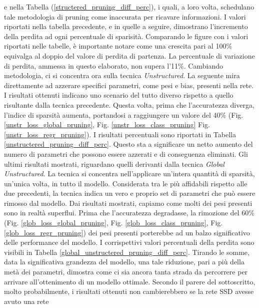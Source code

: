 e nella Tabella (\ref{structered_pruning_diff_perc}), i quali, a loro volta, schedulano tale metodologia 
di pruning come inaccurata per ricavare informazioni. I valori riportati 
nella tabella precedente, e in quelle a seguire, dimostrano l'incremento 
della perdita ad ogni percentuale di sparisità. Comparando le figure con i 
valori riportati nelle tabelle, è importante notare come una crescita pari al 
100\% equivalga al doppio del valore di perdita di partenza. La percentuale 
di variazione di perdita, ammessa in questo elaborato, non supera l'11\%.
Cambiando metodologia, ci si concentra ora sulla tecnica \emph{Unstructured}. La 
seguente mira direttamente ad azzerare specifici parametri, come pesi e bias, 
presenti nella rete. I risultati ottenuti indicano uno scenario del tutto diverso 
rispetto a quello risultante dalla tecnica precedente. Questa volta, prima che 
l'accuratezza diverga, l'indice di sparsità aumenta, portandosi a raggiungere 
un valore del 40\% (Fig. \ref{unstr_loss_global_pruning}, Fig. \ref{unstr_loss_class_pruning} Fig. \ref{unstr_loss_regr_pruning}). I risultati percentuali 
sono riportati in Tabella \ref{unstructered_pruning_diff_perc}. Questo sta a significare un netto aumento del 
numero di parametri che possono essere azzerati e di conseguenza eliminati. 
Gli ultimi risultati mostrati, riguardano quelli derivanti dalla tecnica \emph{Global 
Unstructured}. La tecnica si concentra nell'applicare un'intera quantità 
di sparsità, un'unica volta, in tutto il modello. Considerata tra le più 
affidabili rispetto alle due precedenti, la tecnica indica un vero e proprio 
set di parametri che può essere rimosso dal modello. Dai risultati mostrati, 
capiamo come molti dei pesi presenti sono in realtà superflui. Prima che 
l'accuratezza degradasse, la rimozione del 60\% (Fig. \ref{glob_loss_global_pruning}, Fig. \ref{glob_loss_class_pruning}, Fig. 
\ref{glob_loss_regr_pruning}) dei pesi presenti porterebbe ad un balzo significativo delle performance 
del modello. I corrispettivi valori percentuali della perdita sono visibili in 
Tabella \ref{global_unstructered_pruning_diff_perc}. Tirando le somme, data la significativa grandezza del modello, 
una tale riduzione, pari a più della metà dei parametri, dimostra come ci 
sia ancora tanta strada da percorrere per arrivare all'ottenimento di un 
modello ottimale. Secondo il parere del sottoscritto, molto probabilmente, i 
risultati ottenuti non cambierebbero se la rete SSD avesse avuto una rete 
